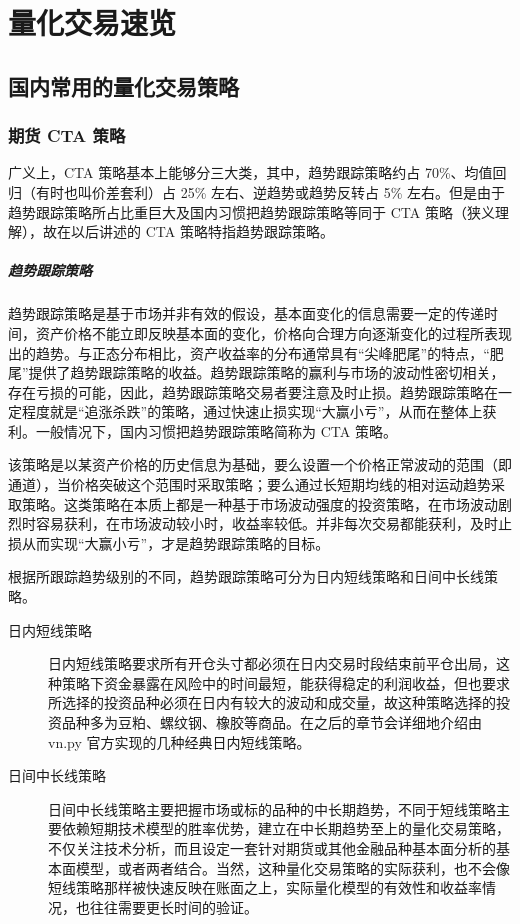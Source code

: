 \chapter{量化交易速览}
\section{国内常用的量化交易策略}
\subsection{期货 CTA 策略}
广义上，CTA 策略基本上能够分三大类，其中，趋势跟踪策略约占 70\%、均值回归（有时也叫价差套利）占 25\% 左右、逆趋势或趋势反转占 5\% 左右。但是由于趋势跟踪策略所占比重巨大及国内习惯把趋势跟踪策略等同于 CTA 策略（狭义理解），故在以后讲述的 CTA 策略特指趋势跟踪策略。

\paragraph{趋势跟踪策略} 趋势跟踪策略是基于市场并非有效的假设，基本面变化的信息需要一定的传递时间，资产价格不能立即反映基本面的变化，价格向合理方向逐渐变化的过程所表现出的趋势。与正态分布相比，资产收益率的分布通常具有“尖峰肥尾”的特点，“肥尾”提供了趋势跟踪策略的收益。趋势跟踪策略的赢利与市场的波动性密切相关，存在亏损的可能，因此，趋势跟踪策略交易者要注意及时止损。趋势跟踪策略在一定程度就是“追涨杀跌”的策略，通过快速止损实现“大赢小亏”，从而在整体上获利。一般情况下，国内习惯把趋势跟踪策略简称为 CTA 策略。

该策略是以某资产价格的历史信息为基础，要么设置一个价格正常波动的范围（即通道），当价格突破这个范围时采取策略；要么通过长短期均线的相对运动趋势采取策略。这类策略在本质上都是一种基于市场波动强度的投资策略，在市场波动剧烈时容易获利，在市场波动较小时，收益率较低。并非每次交易都能获利，及时止损从而实现“大赢小亏”，才是趋势跟踪策略的目标。

根据所跟踪趋势级别的不同，趋势跟踪策略可分为日内短线策略和日间中长线策略。
\begin{description}
    \item[日内短线策略] 日内短线策略要求所有开仓头寸都必须在日内交易时段结束前平仓出局，这种策略下资金暴露在风险中的时间最短，能获得稳定的利润收益，但也要求所选择的投资品种必须在日内有较大的波动和成交量，故这种策略选择的投资品种多为豆粕、螺纹钢、橡胶等商品。在之后的章节会详细地介绍由 vn.py 官方实现的几种经典日内短线策略。
    \item[日间中长线策略] 日间中长线策略主要把握市场或标的品种的中长期趋势，不同于短线策略主要依赖短期技术模型的胜率优势，建立在中长期趋势至上的量化交易策略，不仅关注技术分析，而且设定一套针对期货或其他金融品种基本面分析的基本面模型，或者两者结合。当然，这种量化交易策略的实际获利，也不会像短线策略那样被快速反映在账面之上，实际量化模型的有效性和收益率情况，也往往需要更长时间的验证。
\end{description}

